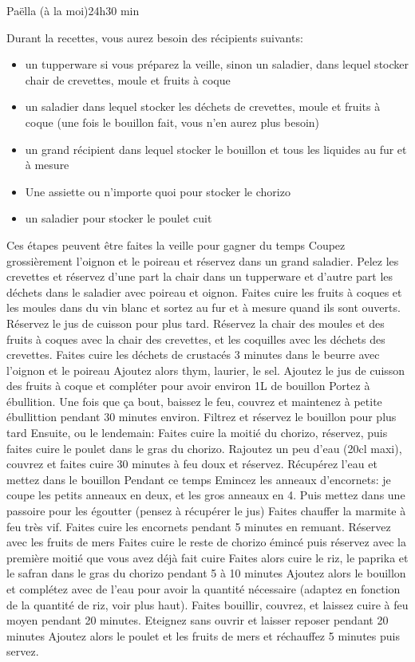 {\begin{recette}{Paëlla (à la moi)}{2}{4h}{30 min}
\begin{preparation}
\etape Durant la recettes, vous aurez besoin des récipients suivants:
\begin{itemize}
\item un tupperware si vous préparez la veille, sinon un saladier, dans lequel stocker chair de crevettes, moule et fruits à coque
\item un saladier dans lequel stocker les déchets de crevettes, moule et fruits à coque (une fois le bouillon fait, vous n'en aurez plus besoin)
\item un grand récipient dans lequel stocker le bouillon et tous les liquides au fur et à mesure
\item Une assiette ou n'importe quoi pour stocker le chorizo
\item un saladier pour stocker le poulet cuit
\end{itemize}
\etape Ces étapes peuvent être faites la veille pour gagner du temps
\etape Coupez grossièrement l'oignon et le poireau et réservez dans un grand saladier.
\etape Pelez les crevettes et réservez d'une part la chair dans un tupperware et d'autre part les déchets dans le saladier avec poireau et oignon.
\etape Faites cuire les fruits à coques et les moules dans du vin blanc et sortez au fur et à mesure quand ils sont ouverts.
\etape Réservez le jus de cuisson pour plus tard. 
\etape Réservez la chair des moules et des fruits à coques avec la chair des crevettes, et les coquilles avec les déchets des crevettes.
\etape Faites cuire les déchets de crustacés 3 minutes dans le beurre avec l'oignon et le poireau
\etape Ajoutez alors thym, laurier, le sel. Ajoutez le jus de cuisson des fruits à coque et compléter pour avoir environ 1L de bouillon
\etape Portez à ébullition. Une fois que ça bout, baissez le feu, couvrez et maintenez à petite ébullittion pendant 30 minutes environ. 
\etape Filtrez et réservez le bouillon pour plus tard
\etape Ensuite, ou le lendemain:
\etape Faites cuire la moitié du chorizo, réservez, puis faites cuire le poulet dans le gras du chorizo. Rajoutez un peu d'eau (20cl maxi), couvrez et faites cuire 30 minutes à feu doux et réservez. Récupérez l'eau et mettez dans le bouillon
\etape Pendant ce temps Emincez les anneaux d'encornets: je coupe les petits anneaux en deux, et les gros anneaux en 4. Puis mettez dans une passoire pour les égoutter (pensez à récupérer le jus)
\etape Faites chauffer la marmite à feu très vif. Faites cuire les encornets pendant 5 minutes en remuant. Réservez avec les fruits de mers
\etape Faites cuire le reste de chorizo émincé puis réservez avec la première moitié que vous avez déjà fait cuire
\etape Faites alors cuire le riz, le paprika et le safran dans le gras du chorizo pendant 5 à 10 minutes
\etape Ajoutez alors le bouillon et complétez avec de l'eau pour avoir la quantité nécessaire (adaptez en fonction de la quantité de riz, voir plus haut). 
\etape Faites bouillir, couvrez, et laissez cuire à feu moyen pendant 20 minutes. 
\etape Eteignez sans ouvrir et laisser reposer pendant 20 minutes
\etape Ajoutez alors le poulet et les fruits de mers et réchauffez 5 minutes puis servez.
\end{preparation}
\end{recette}

}
